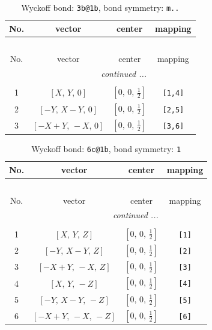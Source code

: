 \documentclass[fleqn,8pt]{jsarticle}
\begin{document}
\renewcommand{\arraystretch}{1.2}
\begin{longtable}{cccc}
\caption{Wyckoff bond: {\tt 3b@1b}, bond symmetry: {\tt m..}}
 \\
 \hline \hline
No. & vector & center & mapping \\ \hline \endfirsthead

\multicolumn{3}{l}{\tablename\ \thetable{}} \\
 \hline \hline
No. & vector & center & mapping \\ \hline \endhead

 \hline \hline
\multicolumn{3}{r}{\footnotesize\it continued ...} \\ \endfoot

 \hline \hline
\multicolumn{3}{r}{} \\ \endlastfoot

1 & $\left[ X,\, Y,\, 0 \right]$ & $\left[ 0,\, 0,\, \frac{1}{2} \right]$ & {\tt [1,4]} \\ \hline
2 & $\left[ - Y,\, X - Y,\, 0 \right]$ & $\left[ 0,\, 0,\, \frac{1}{2} \right]$ & {\tt [2,5]} \\ \hline
3 & $\left[ - X + Y,\, - X,\, 0 \right]$ & $\left[ 0,\, 0,\, \frac{1}{2} \right]$ & {\tt [3,6]} \\
\end{longtable}
\renewcommand{\arraystretch}{1.2}
\begin{longtable}{cccc}
\caption{Wyckoff bond: {\tt 6c@1b}, bond symmetry: {\tt 1}}
 \\
 \hline \hline
No. & vector & center & mapping \\ \hline \endfirsthead

\multicolumn{3}{l}{\tablename\ \thetable{}} \\
 \hline \hline
No. & vector & center & mapping \\ \hline \endhead

 \hline \hline
\multicolumn{3}{r}{\footnotesize\it continued ...} \\ \endfoot

 \hline \hline
\multicolumn{3}{r}{} \\ \endlastfoot

1 & $\left[ X,\, Y,\, Z \right]$ & $\left[ 0,\, 0,\, \frac{1}{2} \right]$ & {\tt [1]} \\ \hline
2 & $\left[ - Y,\, X - Y,\, Z \right]$ & $\left[ 0,\, 0,\, \frac{1}{2} \right]$ & {\tt [2]} \\ \hline
3 & $\left[ - X + Y,\, - X,\, Z \right]$ & $\left[ 0,\, 0,\, \frac{1}{2} \right]$ & {\tt [3]} \\ \hline
4 & $\left[ X,\, Y,\, - Z \right]$ & $\left[ 0,\, 0,\, \frac{1}{2} \right]$ & {\tt [4]} \\ \hline
5 & $\left[ - Y,\, X - Y,\, - Z \right]$ & $\left[ 0,\, 0,\, \frac{1}{2} \right]$ & {\tt [5]} \\ \hline
6 & $\left[ - X + Y,\, - X,\, - Z \right]$ & $\left[ 0,\, 0,\, \frac{1}{2} \right]$ & {\tt [6]} \\
\end{longtable}
\end{document}
